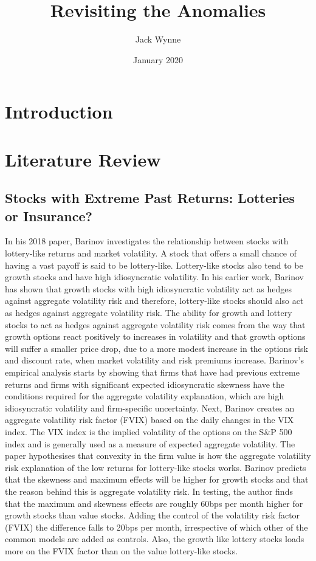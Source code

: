 \documentclass[a4paper,12pt]{article}                 %
\begin{document}
\title{Revisiting the Anomalies }
\author{Jack Wynne}
\date{January 2020}
\maketitle
\section{Introduction}
\section{Literature Review}
\subsection{Stocks with Extreme Past Returns: Lotteries or Insurance?}
In his 2018 paper, Barinov investigates the relationship between stocks with lottery-like returns and market volatility. A stock that offers a small chance of having a vast payoff is said to be lottery-like. Lottery-like stocks also tend to be growth stocks and have high idiosyncratic volatility. In his earlier work, Barinov has shown that growth stocks with high idiosyncratic volatility act as hedges against aggregate volatility risk and therefore, lottery-like stocks should also act as hedges against aggregate volatility risk. The ability for growth and lottery stocks to act as hedges against aggregate volatility risk comes from the way that growth options react positively to increases in volatility and that growth options will suffer a smaller price drop, due to a more modest increase in the options risk and discount rate, when market volatility and risk premiums increase. 
Barinov’s empirical analysis starts by showing that firms that have had previous extreme returns and firms with significant expected idiosyncratic skewness have the conditions required for the aggregate volatility explanation, which are high idiosyncratic volatility and firm-specific uncertainty. Next, Barinov creates an aggregate volatility risk factor (FVIX) based on the daily changes in the VIX index. The VIX index is the implied volatility of the options on the S\&P 500 index and is generally used as a measure of expected aggregate volatility. 
The paper hypothesises that convexity in the firm value is how the aggregate volatility risk explanation of the low returns for lottery-like stocks works. Barinov predicts that the skewness and maximum effects will be higher for growth stocks and that the reason behind this is aggregate volatility risk. In testing, the author finds that the maximum and skewness effects are roughly 60bps per month higher for growth stocks than value stocks. Adding the control of the volatility risk factor (FVIX) the difference falls to 20bps per month, irrespective of which other of the common models are added as controls. Also, the growth like lottery stocks loads more on the FVIX factor than on the value lottery-like stocks. 
\end{document}
